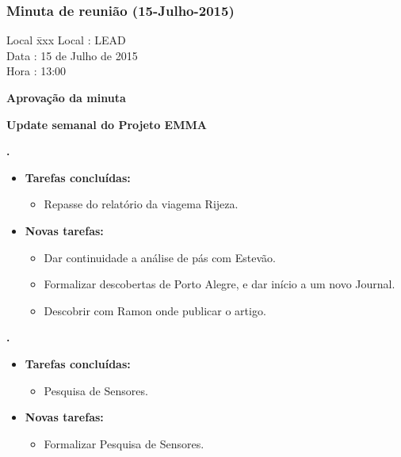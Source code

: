 \subsubsection{Minuta de reunião (15-Julho-2015)}

\begin{tabbing}
  Local \= xxx \kill
  Local \> : LEAD \\
  Data  \> : 15 de Julho de 2015 \\
  Hora  \> : 13:00
\end{tabbing}


\textbf{Aprovação da minuta}

\textbf{Update semanal do Projeto EMMA}

  
\textbf{\renan.} 
	\begin{itemize}
		\item \textbf{Tarefas concluídas:}
			\begin{itemize}    
				\item Repasse do relatório da viagema Rijeza.
			\end{itemize}
		
		\item \textbf{Novas tarefas:}
			\begin{itemize} 
				\item Dar continuidade a análise de pás com Estevão.
				\item Formalizar descobertas de Porto Alegre, e dar início a um novo
				Journal.
				\item Descobrir com Ramon onde publicar o artigo.
			\end{itemize}
	\end{itemize}
		
\textbf{\elael.} 
	\begin{itemize}
		\item \textbf{Tarefas concluídas:}
			\begin{itemize}    
				\item Pesquisa de Sensores.
			\end{itemize}
		
		\item \textbf{Novas tarefas:}
			\begin{itemize} 
				\item Formalizar Pesquisa de Sensores.
			\end{itemize}
	\end{itemize}
					
